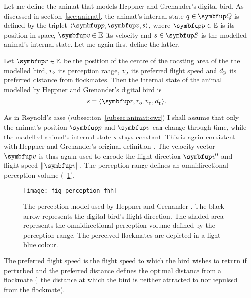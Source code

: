 Let me define the animat that models Heppner and Grenander's digital bird. As discussed in section~\ref{sec:animat}, the animat's internal state $q \in \set{Q}$ is defined by the triplet $\langle \vect{p}, \vect{v}, s \rangle$, where $\vect{p} \in \E$ is its position in space, $\vect{v} \in \E$ its velocity and $s \in \set{S}$ is the modelled animal's internal state. Let me again first define the latter.

\begin{definition}
  \label{def:animat:s:fhh}
  Let $\vect{r} \in \E$ be the position of the centre of the roosting area of the the modelled bird, $r_\textnormal{o}$ its perception range, $v_\textnormal{p}$ its preferred flight speed and $d_\textnormal{p}$ its preferred distance from flockmates. Then the internal state of the animal modelled by Heppner and Grenander's digital bird is
  \begin{equation}
    s=\langle \vect{r}, r_\textnormal{o}, v_\textnormal{p}, d_\textnormal{p} \rangle.
  \end{equation}
\end{definition}

As in Reynold's case (subsection~\ref{subsec:animat:cwr}) I shall assume that only the animat's position $\vect{p}$ and $\vect{v}$ can change through time, while the   modelled animal's internal state $s$ stays constant. This is again consistent with Heppner and Grenander's original definition \cite{heppner:1990}. The velocity vector $\vect{v}$ is thus again used to encode the flight direction $\vect{v}^0$ and flight speed $\left\|\vect{v}\right\|$. The perception range defines an omnidirectional perception volume (\fig~\ref{fig:perception:fhh}).

\begin{figure}
  \texttt{[image: fig\_perception\_fhh]}
  \caption{The perception model used by Heppner and Grenander \cite{heppner:1990}. The black arrow represents the digital bird's flight direction. The shaded area represents the omnidirectional perception volume defined by the perception range. The perceived flockmates are depicted in a light blue colour.}
  \label{fig:perception:fhh}
\end{figure}

The preferred flight speed is the flight speed to which the bird wishes to return if perturbed and the preferred distance defines the optimal distance from a flockmate (\ie\ the distance at which the bird is neither attracted to nor repulsed from the flockmate).

